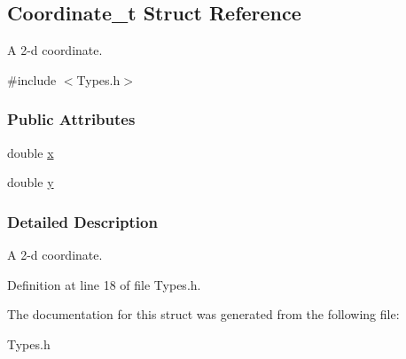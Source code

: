 \hypertarget{structCoordinate__t}{
\subsection{Coordinate\_\-t Struct Reference}
\label{structCoordinate__t}
}


A 2-\/d coordinate.  




{\ttfamily \#include $<$Types.h$>$}

\subsubsection*{Public Attributes}
\begin{DoxyCompactItemize}
\item 
\hypertarget{structCoordinate__t_a4e83334eabbe707ae5433ff65f60a475}{
double \hyperlink{structCoordinate__t_a4e83334eabbe707ae5433ff65f60a475}{x}}
\label{structCoordinate__t_a4e83334eabbe707ae5433ff65f60a475}

\item 
\hypertarget{structCoordinate__t_abbc494db10b22a87bede79c5b62be604}{
double \hyperlink{structCoordinate__t_abbc494db10b22a87bede79c5b62be604}{y}}
\label{structCoordinate__t_abbc494db10b22a87bede79c5b62be604}

\end{DoxyCompactItemize}


\subsubsection{Detailed Description}
A 2-\/d coordinate. 

Definition at line 18 of file Types.h.



The documentation for this struct was generated from the following file:\begin{DoxyCompactItemize}
\item 
Types.h\end{DoxyCompactItemize}

